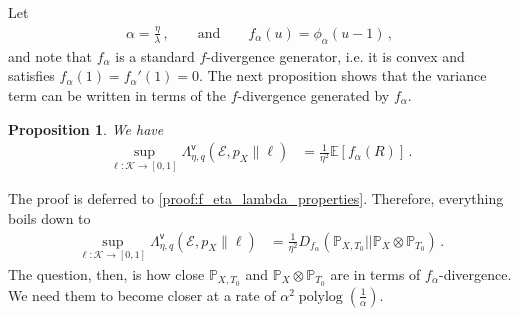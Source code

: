 \documentclass{article}
\theoremstyle{plain}
\newtheorem{proposition}[theorem]{Proposition}
\theoremstyle{definition}
\theoremstyle{plain}
\newcommand{\E}{\mathbb E}
\newcommand{\K}{\mathcal K}
\newcommand{\PP}{\mathbb P}
\newcommand{\cE}{\mathcal E}
\newcommand{\polylog}{\operatorname{polylog}}
\begin{document}
Let
\begin{align}
    \alpha = \frac{\eta}{\lambda}\,, \qquad \text{and}\qquad f_\alpha(u) = \phi_\alpha(u-1)\,,
\end{align}
and note that $f_\alpha$ is a standard $f$-divergence generator, i.e. it is convex and satisfies $f_\alpha(1)=f_\alpha'(1)=0$.
The next proposition shows that the variance term can be written in terms of the $f$-divergence generated by $f_\alpha$.
\begin{proposition}
    \label{prop:f_eta_lambda_properties}
    We have
    \begin{align}
        \sup_{\ell: \K \to [0,1]}
        \Lambda^{\mathsf{v}}_{\eta, q}(\cE, p_X\| \ell)
         & =\frac{1}{\eta^2}
        \E\left[ f_{\alpha}(R) \right]
        \,.
        \label{eq:phi_eta_f_divergence_relation}
    \end{align}
\end{proposition}
The proof is deferred to \cref{proof:f_eta_lambda_properties}.
Therefore, everything boils down to
\begin{align}
    \sup_{\ell: \K \to [0,1]}
    \Lambda^{\mathsf{v}}_{\eta, q}(\cE, p_X\| \ell)
     & =
    \frac{1}{\eta^2} D_{f_{\alpha}}(\PP_{X, T_0} || \PP_X \otimes \PP_{T_0})\,.
\end{align}
The question, then, is how close $\PP_{X, T_0}$ and $\PP_X \otimes \PP_{T_0}$ are in terms of $f_{\alpha}$-divergence.
We need them to become closer at a rate of $\alpha^2 \polylog(\frac{1}{\alpha})$.
\end{document}
